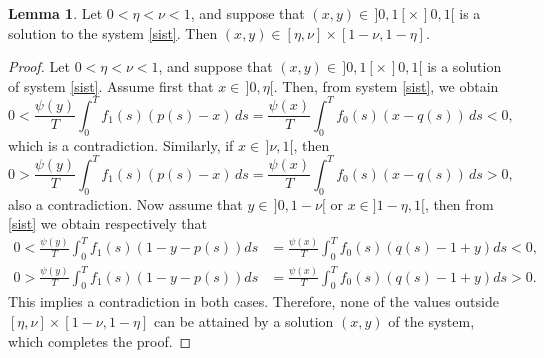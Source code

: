 \documentclass[11pt,reqno]{amsart}
\theoremstyle{definition}
\newtheorem{Lemma}{Lemma}
\begin{document}
\begin{Lemma}\label{Fromt}
Let $0 < \eta < \nu < 1$, and suppose that $(x, y) \in \,]0,1[ \times \,]0,1[$ is a solution to the system \eqref{sist}. Then $(x, y) \in [\eta, \nu] \times [1 - \nu, 1 - \eta].$
\end{Lemma}

\begin{proof}
Let $0 < \eta < \nu < 1$, and suppose that $(x, y) \in\, ]0,1[ \times \,]0,1[$ is a solution of system \eqref{sist}. 
Assume first that $x \in\, ]0, \eta[$. Then, from system \eqref{sist}, we obtain
$$0 < \frac{\psi(y)}{T} \int_0^T f_1(s)(p(s) - x)\, ds = \frac{\psi(x)}{T} \int_0^T f_0(s)(x - q(s))\, ds < 0,$$
which is a contradiction. Similarly, if $x \in\, ]\nu, 1[$, then
$$ 0 > \frac{\psi(y)}{T} \int_0^T f_1(s)(p(s) - x)\, ds = \frac{\psi(x)}{T} \int_0^T f_0(s)(x - q(s))\, ds > 0, $$
also a contradiction.
Now assume that $y \in\, ]0, 1 - \nu[$ or $x\in]1-\eta,1[$, then from \eqref{sist}  we obtain respectively that
     \begin{align*}
     0<\frac{\psi( y)}{T}\int_0^Tf_1(s)(1-y-p(s))ds&= \frac{\psi(x )}{T}\int_0^Tf_0(s)(q(s)-1+y)ds<0,\\
         0>\frac{\psi(y)}{T}\int_0^Tf_1(s)(1-y-p(s))ds&= \frac{\psi(x )}{T}\int_0^Tf_0(s)(q(s)-1+y)ds>0.         
     \end{align*}
     This implies a contradiction in both cases.
Therefore, none of the values outside $[\eta, \nu] \times [1 - \nu, 1 - \eta]$ can be attained by a solution $(x, y)$ of the system, which completes the proof.
\end{proof}
\end{document}
